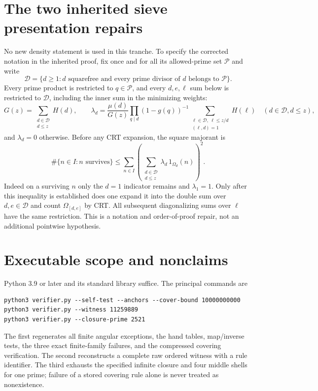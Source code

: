 \documentclass[11pt]{article}
\theoremstyle{definition}\newtheorem{definition}[theorem]{Definition}
\theoremstyle{remark}\newtheorem{remark}[theorem]{Remark}
\begin{document}
\section{The two inherited sieve presentation repairs}\label{app:sieve}
No new density statement is used in this tranche. To specify the corrected notation in the inherited proof, fix once and for all its allowed-prime set $\mathcal P$ and write
\[
 \mathcal D=\{d\ge1:d\text{ squarefree and every prime divisor of }d
                      \text{ belongs to }\mathcal P\}.
\]
Every prime product is restricted to $q\in\mathcal P$, and every $d,e,\ell$ sum below is restricted to $\mathcal D$, including the inner sum in the minimizing weights:
\[
 G(z)=\sum_{\substack{d\in\mathcal D\\d\le z}}H(d),\qquad
 \lambda_d=\frac{\mu(d)}{G(z)}
 \prod_{q\mid d}(1-g(q))^{-1}
 \sum_{\substack{\ell\in\mathcal D,\ \ell\le z/d\\(\ell,d)=1}}H(\ell)
 \quad(d\in\mathcal D,d\le z),
\]
and $\lambda_d=0$ otherwise. Before any CRT expansion, the square majorant is
\[
 \#\{n\in I:n\text{ survives}\}
 \le\sum_{n\in I}
 \left(\sum_{\substack{d\in\mathcal D\\d\le z}}
             \lambda_d\,1_{\Omega_d}(n)\right)^2.
\]
Indeed on a surviving $n$ only the $d=1$ indicator remains and $\lambda_1=1$. Only after this inequality is established does one expand it into the double sum over $d,e\in\mathcal D$ and count $\Omega_{[d,e]}$ by CRT. All subsequent diagonalizing sums over $\ell$ have the same restriction. This is a notation and order-of-proof repair, not an additional pointwise hypothesis.

\section{Executable scope and nonclaims}
Python 3.9 or later and its standard library suffice. The principal commands are
\begin{lstlisting}
python3 verifier.py --self-test --anchors --cover-bound 10000000000
python3 verifier.py --witness 11259889
python3 verifier.py --closure-prime 2521
\end{lstlisting}
The first regenerates all finite angular exceptions, the hand tables, map/inverse tests, the three exact finite-family failures, and the compressed covering verification. The second reconstructs a complete raw ordered witness with a rule identifier. The third exhausts the specified infinite closure and four middle shells for one prime; failure of a stored covering rule alone is never treated as nonexistence.
\end{document}

